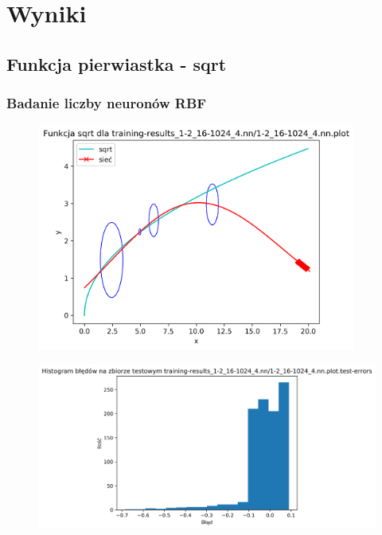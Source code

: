 \documentclass{classrep}
\begin{document}
    \section{Wyniki}
    {
        \subsection{Funkcja pierwiastka - sqrt}
        {
            \subsubsection{Badanie liczby neuronów RBF}
            {
                \begin{figure}[!htbp]
                    \centering
                    \includegraphics[width=105mm]{wykresy/1-2_16-1024_4_nn_plot.png}
                \end{figure}
                \begin{figure}[!htbp]
                    \centering
                    \includegraphics[width=140mm]{wykresy/1-2_16-1024_4_nn_plot_test-errors.png}
                \end{figure}
                \begin{figure}[!htbp]
                    \centering

\end{figure}}}}
\end{document}
